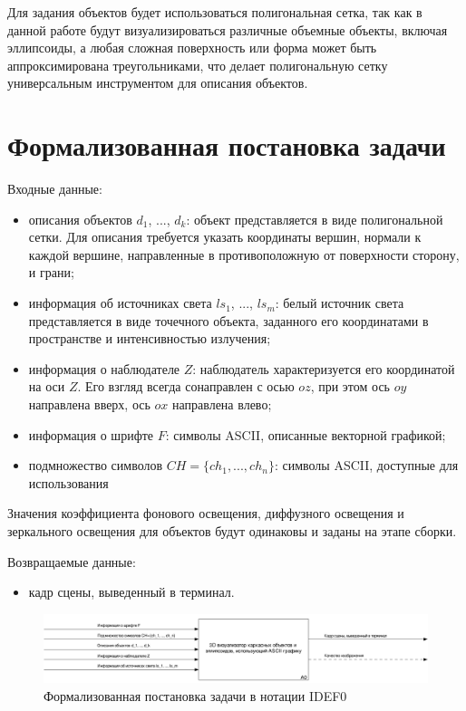 Для задания объектов будет использоваться полигональная сетка, так как в данной работе будут визуализироваться различные объемные объекты, включая эллипсоиды, а любая сложная поверхность или форма может быть аппроксимирована треугольниками, что делает полигональную сетку универсальным инструментом для описания объектов.

\section{Формализованная постановка задачи}

Входные данные:
\begin{itemize}
	\item описания объектов $d_1$, ..., $d_k$: объект представляется в виде полигональной сетки. Для описания требуется указать координаты вершин, нормали к каждой вершине, направленные в противоположную от поверхности сторону, и грани;
	\item информация об источниках света $ls_1$, ..., $ls_m$: белый источник света представляется в виде точечного объекта, заданного его координатами в пространстве и интенсивностью излучения;
	\item информация о наблюдателе $Z$: наблюдатель характеризуется его координатой на оси $Z$. Его взгляд всегда сонаправлен с осью $oz$, при этом ось $oy$ направлена вверх, ось $ox$ направлена влево;
    \item информация о шрифте $F$: символы ASCII, описанные векторной графикой;
    \item подмножество символов $CH=\{ch_1, ..., ch_n\}$: символы ASCII, доступные для использования
\end{itemize}

Значения коэффициента фонового освещения, диффузного освещения и зеркального освещения для объектов будут одинаковы и заданы на этапе сборки.

Возвращаемые данные:
\begin{itemize}
    \item кадр сцены, выведенный в терминал.
\end{itemize}

\begin{figure}[H]
    \centering
    \includegraphics[scale=0.2]{images/01_A0.png}
    \caption{Формализованная постановка задачи в нотации IDEF0}
    \label{fig:idef0-0}
\end{figure}



